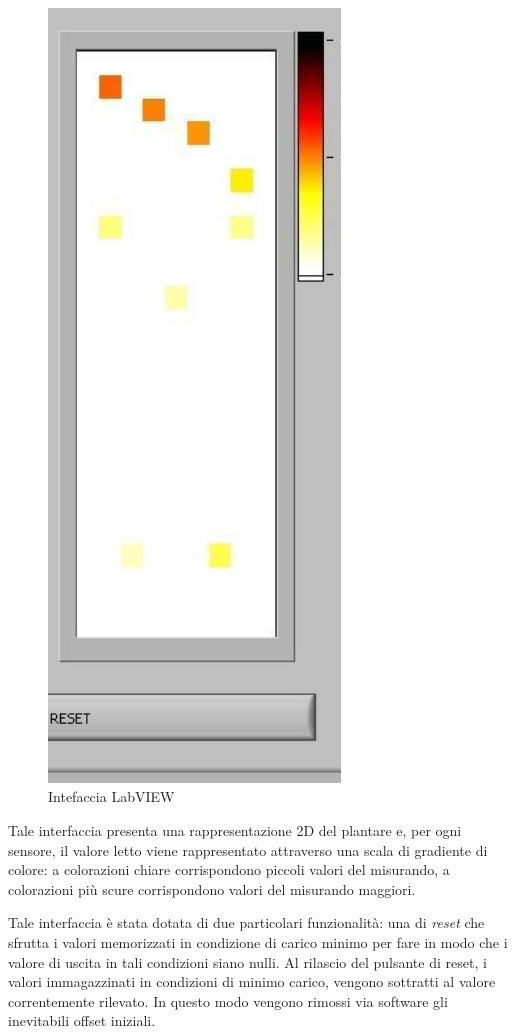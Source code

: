 \documentclass[12pt,a4paper,oneside,openright,italian]{article}
\begin{document}
\begin{figure}[!hbp]
  \centering
  \includegraphics[width=220pt]{immagini/labview.jpg}
  \caption{Intefaccia LabVIEW}
  \label{alimentazione}
\end{figure}

Tale interfaccia presenta una rappresentazione 2D del plantare e, per ogni sensore, il valore letto viene rappresentato attraverso una scala di gradiente di colore: a colorazioni chiare corrispondono piccoli valori del misurando, a colorazioni pi\`u scure corrispondono valori del misurando maggiori.

Tale interfaccia \`e stata dotata di due particolari funzionalit\`a: una di \emph{reset} che sfrutta i valori memorizzati in condizione di carico minimo per fare in modo che i valore di uscita in tali condizioni siano nulli.
Al rilascio del pulsante di reset, i valori immagazzinati in condizioni di minimo carico, vengono sottratti al valore correntemente rilevato. In questo modo vengono rimossi via software gli inevitabili offset iniziali.
\end{document}
